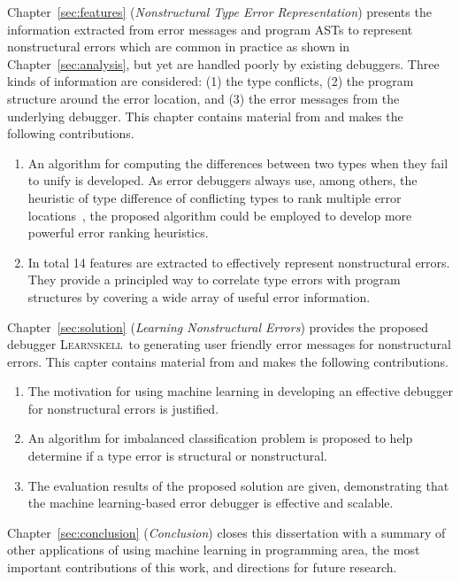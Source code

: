 \documentclass[12pt]{report}	%
\newcommand{\newCompiler}{\textsc{Learnskell}}
\begin{document}
Chapter~\ref{sec:features} (\emph{Nonstructural Type Error Representation}) presents the information extracted from error messages and program ASTs 
to represent nonstructural errors which are common in practice as shown in Chapter~\ref{sec:analysis}, but yet are handled poorly by existing debuggers.
Three kinds of information are considered: (1) the type conflicts, (2) the program structure around the error location,
and (3) the error messages from the underlying debugger.
This chapter contains material from \cite{wu2017learning} and makes the following contributions.

\begin{enumerate}
\item An algorithm for computing the differences between two types when they fail to unify is developed.
As error debuggers always use, among others, the heuristic of type difference of conflicting types to rank multiple error locations~\cite{Chen14:CFT,Hage07:HTE},
the proposed algorithm could be employed to develop more powerful error ranking heuristics.

\item In total 14 features are extracted to effectively represent nonstructural errors.
They provide a principled way to correlate type errors with program structures by covering a wide array of useful error information.
\end{enumerate}

Chapter~\ref{sec:solution} (\emph{Learning Nonstructural Errors}) provides the proposed debugger \newCompiler\ 
to generating user friendly error messages for nonstructural errors.
This capter contains material from \cite{wu2017learning} and makes the following contributions.

\begin{enumerate}
\item The motivation for using machine learning in developing an effective debugger for nonstructural errors is justified.

\item An algorithm for imbalanced classification problem is proposed to help determine if a type error is structural or nonstructural.

\item The evaluation results of the proposed solution are given, demonstrating that the machine learning-based error debugger is effective and scalable.
\end{enumerate}

Chapter~\ref{sec:conclusion} (\emph{Conclusion}) closes this dissertation with a summary of other applications of using machine learning in programming area,
the most important contributions of this work, and directions for future research.
\end{document}
